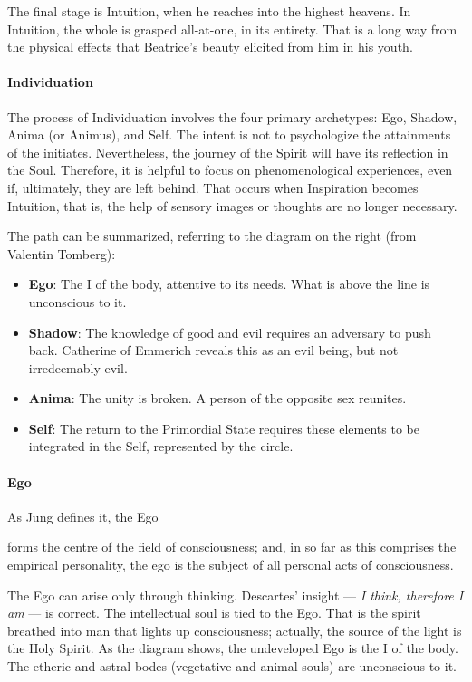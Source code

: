 The final stage is Intuition, when he reaches into the highest heavens. In Intuition, the whole is grasped all-at-one, in its entirety. That is a long way from the physical effects that Beatrice's beauty elicited from him in his youth.

\paragraph{Individuation}

The process of Individuation involves the four primary archetypes: Ego, Shadow, Anima (or Animus), and Self. The intent is not to psychologize the attainments of the initiates. Nevertheless, the journey of the Spirit will have its reflection in the Soul. Therefore, it is helpful to focus on phenomenological experiences, even if, ultimately, they are left behind. That occurs when Inspiration becomes Intuition, that is, the help of sensory images or thoughts are no longer necessary.

The path can be summarized, referring to the diagram on the right (from Valentin Tomberg):

\begin{itemize}
\item \textbf{Ego}: The I of the body, attentive to its needs. What is above the line is unconscious to it. 
\item \textbf{Shadow}: The knowledge of good and evil requires an adversary to push back. Catherine of Emmerich reveals this as an evil being, but not irredeemably evil. 
\item \textbf{Anima}: The unity is broken. A person of the opposite sex reunites. 
\item \textbf{Self}: The return to the Primordial State requires these elements to be integrated in the Self, represented by the circle. 
\end{itemize}
\paragraph{Ego}
As Jung defines it, the Ego

\begin{quotex}
forms the centre of the field of consciousness; and, in so far as this comprises the empirical personality, the ego is the subject of all personal acts of consciousness. 

\end{quotex}
The Ego can arise only through thinking. Descartes' insight — \emph{I think, therefore I am} — is correct. The intellectual soul is tied to the Ego. That is the spirit breathed into man that lights up consciousness; actually, the source of the light is the Holy Spirit. As the diagram shows, the undeveloped Ego is the I of the body. The etheric and astral bodes (vegetative and animal souls) are unconscious to it.

